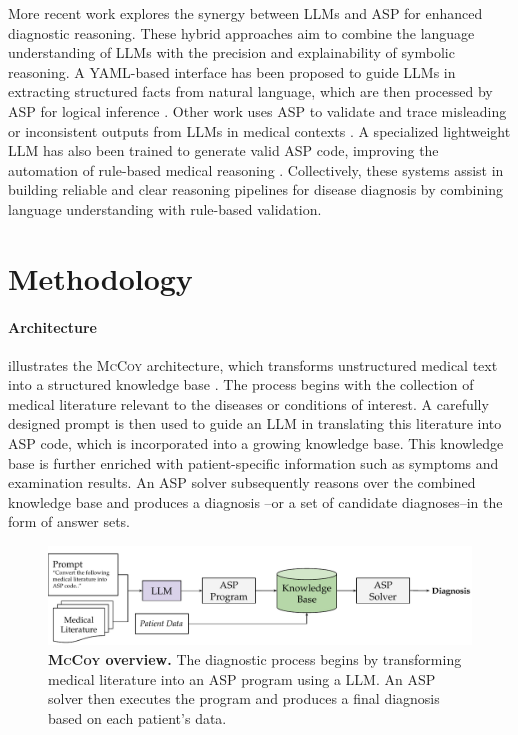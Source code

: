 \documentclass[11pt,leqno]{amsart}
\newcommand{\sys}{\textsc{McCoy}\xspace}
\begin{document}
More recent work explores the synergy between LLMs and ASP 
for enhanced diagnostic reasoning. 
These hybrid approaches aim to combine the language understanding of LLMs 
with the precision and explainability of symbolic reasoning. 
A YAML-based interface has been proposed to guide LLMs 
in extracting structured facts from natural language, 
which are then processed by ASP for logical inference \cite{alviano2024llm2asp}. 
Other work uses ASP to validate and trace misleading or inconsistent outputs 
from LLMs in medical contexts \cite{Nguyen2025}. 
A specialized lightweight LLM has also been trained to generate valid ASP code, 
improving the automation of rule-based medical reasoning \cite{coppolillo2024llasp}.
Collectively, these systems assist in building reliable and clear reasoning pipelines 
for disease diagnosis by combining language understanding with rule-based validation.

\section{Methodology} \label{sec:methodology}

\paragraph{\textbf{Architecture}}

 illustrates the \sys architecture, 
which transforms unstructured medical text into a structured knowledge base \cite{ré2014feature}. 
The process begins with the collection of medical literature relevant to the diseases or conditions of interest. 
A carefully designed prompt is then used to guide an LLM in translating this literature into ASP code, 
which is incorporated into a growing knowledge base. 
This knowledge base is further enriched with patient-specific information such as symptoms and examination results. 
An ASP solver subsequently reasons over the combined knowledge base and produces a diagnosis
--or a set of candidate diagnoses--in the form of answer sets.

\begin{figure}[t]
    \includegraphics[width=\textwidth]{assets/mccoy.pdf}
    \caption{\textbf{\sys overview.} The diagnostic process begins by transforming medical literature 
    into an ASP program using a LLM. 
    An ASP solver then executes the program and produces a final diagnosis 
    based on each patient’s data.}
    \label{fig:architecture}
\end{figure}
\end{document}
